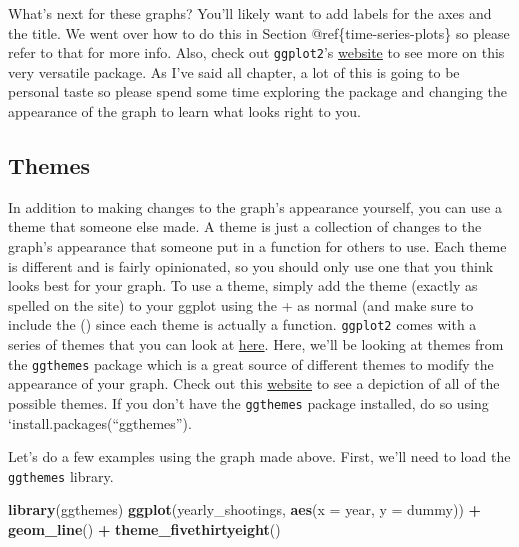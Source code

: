 \documentclass[
  12pt,
]{book}
\newenvironment{Shaded}{\begin{snugshade}}{\end{snugshade}}
\newcommand{\DataTypeTok}[1]{\textcolor[rgb]{0.13,0.29,0.53}{#1}}
\newcommand{\KeywordTok}[1]{\textcolor[rgb]{0.13,0.29,0.53}{\textbf{#1}}}
\newcommand{\NormalTok}[1]{#1}
\newcommand{\OperatorTok}[1]{\textcolor[rgb]{0.81,0.36,0.00}{\textbf{#1}}}
\newcommand{\StringTok}[1]{\textcolor[rgb]{0.31,0.60,0.02}{#1}}
\begin{document}
What's next for these graphs? You'll likely want to add labels for the axes and the title. We went over how to do this in Section @ref\{time-series-plots\} so please refer to that for more info. Also, check out \texttt{ggplot2}'s \href{https://ggplot2.tidyverse.org/reference/index.html\#section-scales}{website} to see more on this very versatile package. As I've said all chapter, a lot of this is going to be personal taste so please spend some time exploring the package and changing the appearance of the graph to learn what looks right to you.

\hypertarget{themes}{%
\subsection{Themes}\label{themes}}

In addition to making changes to the graph's appearance yourself, you can use a theme that someone else made. A theme is just a collection of changes to the graph's appearance that someone put in a function for others to use. Each theme is different and is fairly opinionated, so you should only use one that you think looks best for your graph. To use a theme, simply add the theme (exactly as spelled on the site) to your ggplot using the + as normal (and make sure to include the () since each theme is actually a function. \texttt{ggplot2} comes with a series of themes that you can look at \href{https://ggplot2.tidyverse.org/reference/ggtheme.html}{here}. Here, we'll be looking at themes from the \texttt{ggthemes} package which is a great source of different themes to modify the appearance of your graph. Check out this \href{https://yutannihilation.github.io/allYourFigureAreBelongToUs/ggthemes/}{website} to see a depiction of all of the possible themes. If you don't have the \texttt{ggthemes} package installed, do so using `install.packages(``ggthemes'').

Let's do a few examples using the graph made above. First, we'll need to load the \texttt{ggthemes} library.

\begin{Shaded}
\begin{Highlighting}[]
\KeywordTok{library}\NormalTok{(ggthemes)}
\KeywordTok{ggplot}\NormalTok{(yearly\_shootings, }\KeywordTok{aes}\NormalTok{(}\DataTypeTok{x =}\NormalTok{ year, }\DataTypeTok{y =}\NormalTok{ dummy)) }\OperatorTok{+}
\StringTok{  }\KeywordTok{geom\_line}\NormalTok{() }\OperatorTok{+}
\StringTok{  }\KeywordTok{theme\_fivethirtyeight}\NormalTok{()}
\end{Highlighting}
\end{Shaded}
\end{document}
